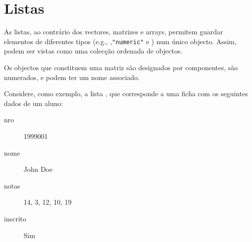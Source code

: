 \documentclass{exam}
\begin{document}
\section{Listas}

As listas, ao contrário dos vectores, matrizes e arrays, permitem guardar elementos de diferentes tipos (e.g., ,\texttt{"numeric"} e ) num único objecto. Assim, podem ser vistas como uma colecção ordenada de objectos.

Os objectos que constituem uma matriz são designados por componentes, são numerados, e podem ter um nome associado.

Considere, como exemplo, a lista , que corresponde a uma ficha com os seguintes dados de um aluno:

\begin{center}
\begin{description}
\item[nro] 1999001
\item[nome] John Doe
\item[notas] 14, 3, 12, 10, 19
\item[inscrito] Sim
\end{description}
\end{center}
\end{document}
